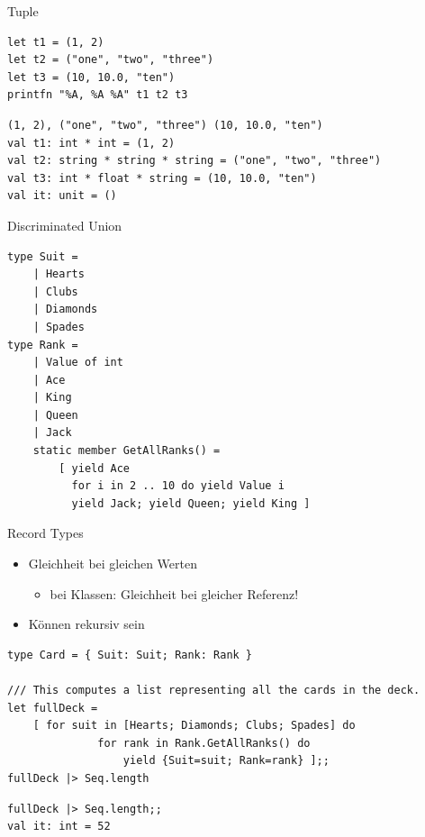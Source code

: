 \documentclass[t]{beamer}
\begin{document}
\begin{frame}[label={sec:org312fa74},fragile]{Tuple}
 \begin{verbatim}
let t1 = (1, 2)
let t2 = ("one", "two", "three")
let t3 = (10, 10.0, "ten")
printfn "%A, %A %A" t1 t2 t3
\end{verbatim}

\begin{verbatim}
(1, 2), ("one", "two", "three") (10, 10.0, "ten")
val t1: int * int = (1, 2)
val t2: string * string * string = ("one", "two", "three")
val t3: int * float * string = (10, 10.0, "ten")
val it: unit = ()
\end{verbatim}
\end{frame}

\begin{frame}[label={sec:org978237b},fragile]{Discriminated Union}
 \begin{verbatim}
type Suit = 
    | Hearts 
    | Clubs 
    | Diamonds 
    | Spades
type Rank = 
    | Value of int
    | Ace
    | King
    | Queen
    | Jack
    static member GetAllRanks() = 
        [ yield Ace
          for i in 2 .. 10 do yield Value i
          yield Jack; yield Queen; yield King ]
\end{verbatim}
\end{frame}

\begin{frame}[label={sec:org1090811},fragile]{Record Types}
 \begin{itemize}
\item Gleichheit bei gleichen Werten 
\begin{itemize}
\item bei Klassen: Gleichheit bei gleicher Referenz!
\end{itemize}
\item Können rekursiv sein
\end{itemize}

\begin{verbatim}
type Card = { Suit: Suit; Rank: Rank }

/// This computes a list representing all the cards in the deck.
let fullDeck = 
    [ for suit in [Hearts; Diamonds; Clubs; Spades] do
              for rank in Rank.GetAllRanks() do 
                  yield {Suit=suit; Rank=rank} ];;
fullDeck |> Seq.length
\end{verbatim}

\begin{verbatim}
fullDeck |> Seq.length;;
val it: int = 52
\end{verbatim}
\end{frame}
\end{document}
